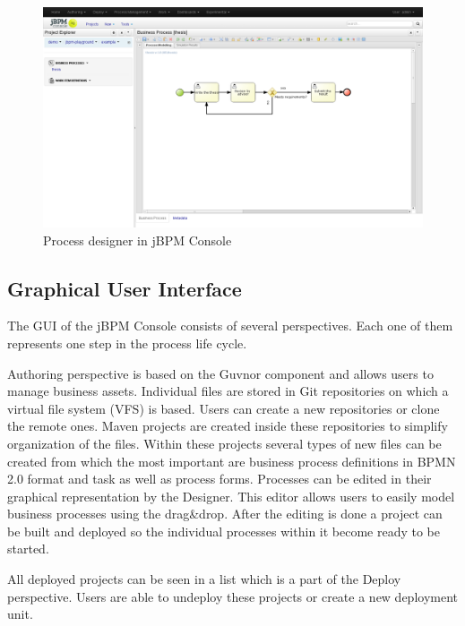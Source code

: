 \documentclass[12pt,oneside,final]{fithesis2}
\begin{document}
\begin{figure}[ht!]
\centering
\includegraphics[width=\textwidth]{images/jbpm-console.png}
\caption{Process designer in jBPM Console}
\label{fig:jbpm-console}
\end{figure}

\subsection{Graphical User Interface}
The GUI of the jBPM Console consists of several perspectives.
Each one of them represents one step in the process life cycle.

Authoring perspective is based on the Guvnor component and allows users to manage business assets.
Individual files are stored in Git\footnotemark{} repositories on which a virtual file system (VFS) is based.
Users can create a new repositories or clone the remote ones.
Maven\footnotemark{} projects are created inside these repositories to simplify organization of the files.
Within these projects several types of new files can be created from which the most important are business process definitions in BPMN 2.0 format and task as well as process forms.
Processes can be edited in their graphical representation by the Designer.
This editor allows users to easily model business processes using the drag\&drop.
After the editing is done a project can be built and deployed so the individual processes within it become ready to be started.

All deployed projects can be seen in a list which is a part of the Deploy perspective.
Users are able to undeploy these projects or create a new deployment unit.
\end{document}
